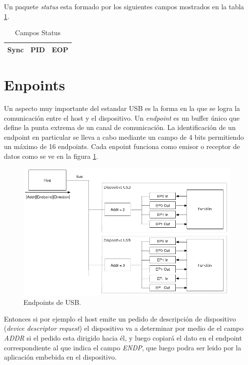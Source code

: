 Un paquete \emph{status} esta formado por los siguientes campos mostrados en la
tabla \ref{tab:usb_status_fields}.

\begin{table}[h]
\centering
\begin{tabular}{|c|c|c|} \hline
Sync & PID & EOP\\ \hline
\end{tabular}
\caption{Campos Status} 
\label{tab:usb_status_fields}
\end{table}


\clearpage
\section{Enpoints}
Un aspecto muy importante del estandar USB es la forma en la que se logra la
comunicaci\'on entre el host y el dispositivo.
Un \emph{endpoint} es un buffer \'unico que define la punta extrema de un
canal de comunicaci\'on. La identificaci\'on de un endpoint en particular se
lleva a cabo mediante un campo de 4 bits permitiendo un m\'aximo de 16
endpoints. Cada enpoint funciona como emisor o receptor de datos como se ve en
la figura \ref{fig:usb_endpoints}.

\begin{figure}
\centering
\includegraphics[scale=0.5]{./img/usb_endpoints.png}
\caption{Endpoints de USB.}
\label{fig:usb_endpoints}
\end{figure}

Entonces si por ejemplo el host emite un pedido de descripci\'on de dispositivo
(\emph{device descriptor request}) el dispositivo va a determinar por medio de
el campo \emph{ADDR} si el pedido esta dirigido hacia \'el, y luego copiar\'a
el dato en el endpoint correspondiente al que indica el campo \emph{ENDP}, que
luego podra ser leido por la aplicaci\'on embebida en el dispositivo.\\

